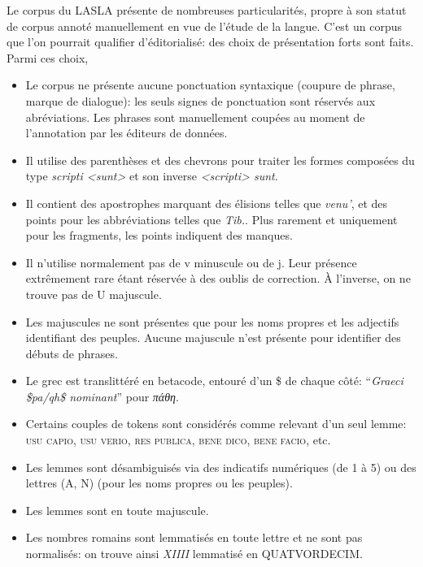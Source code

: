Le corpus du LASLA présente de nombreuses particularités, propre à son statut de corpus annoté manuellement en vue de l'étude de la langue. C'est un corpus que l'on pourrait qualifier d'éditorialisé: des choix de présentation forts sont faits. Parmi ces choix, 
\begin{itemize}
    \item Le corpus ne présente aucune ponctuation syntaxique (coupure de phrase, marque de dialogue): les seuls signes de ponctuation sont réservés aux abréviations. Les phrases sont manuellement coupées au moment de l'annotation par les éditeurs de données. 
    \item Il utilise des parenthèses et des chevrons pour traiter les formes composées du type \textit{scripti <sunt>} et son inverse \textit{<scripti> sunt}.
    \item Il contient des apostrophes marquant des élisions  telles que \textit{venu'}, et des points pour les abbréviations telles que \textit{Tib.}. Plus rarement et uniquement pour les fragments, les points indiquent des manques.
    \item Il n'utilise normalement pas de v minuscule ou de j. Leur présence extrêmement rare étant réservée à des oublis de correction. À l'inverse, on ne trouve pas de U majuscule.
    \item Les majuscules ne sont présentes que pour les noms propres et les adjectifs identifiant des peuples. Aucune majuscule n'est présente pour identifier des débuts de phrases.
    \item Le grec est translittéré en betacode, entouré d'un \$ de chaque côté: \enquote{\textit{Graeci \$pa/qh\$ nominant}} pour \textgreek{\textit{πάθη}}.
    \item Certains couples de tokens sont considérés comme relevant d'un seul lemme: \textsc{usu capio}, \textsc{usu verio}, \textsc{res publica}, \textsc{bene dico}, \textsc{bene facio}, etc.
    \item Les lemmes sont désambiguisés via des indicatifs numériques (de 1 à 5) ou des lettres (A, N) (pour les noms propres ou les peuples).
    \item Les lemmes sont en toute majuscule.
    \item Les nombres romains sont lemmatisés en toute lettre et ne sont pas normalisés: on trouve ainsi \textit{XIIII} lemmatisé en \textsc{QUATVORDECIM}.
\end{itemize}

